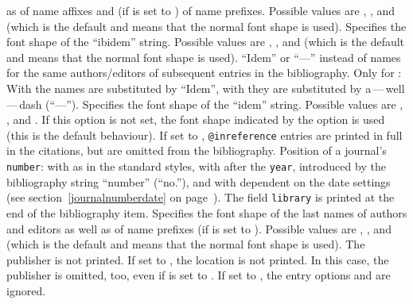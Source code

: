 \documentclass[english]{scrartcl}
\begin{document}
	  as of name affixes and (if  is set to ) of 
	  name prefixes. Possible values are , , 
	   and  (which is the default and means that the 
	  normal font shape is used).
	  Specifies the font shape of the \enquote{ibidem} string.
	  Possible values are , ,  and 
	   (which is the default and means that the normal font shape 
	  is used).
	  \enquote{Idem} or \enquote{---} instead of names for the same 
	  authors\slash editors of subsequent entries in the bibliography.
	  Only for : With  the names are substituted 
	  by \enquote{Idem}, with  they are substituted by
	  a\,---\,well\,---\,dash (\enquote{---}).
	  Specifies the font shape of the \enquote{idem} string.
	  Possible values are , ,  and 
	  . If this option is not set, the font shape indicated by the 
	  option  is used (this is the default behaviour).
	  If set to , \texttt{@inreference} entries are printed in full
	  in the citations, but are omitted from the bibliography.
	  Position of a journal's \texttt{number}: with  as in the 
	  standard styles, with  after the \texttt{year}, introduced 
	  by the bibliography string \enquote{number} (\enquote{no.}), and with 
	   dependent on the date settings (see 
	  section~\ref{journalnumberdate} on page~\pageref{journalnumberdate}).
	  The field \texttt{library} is printed at the end of the bibliography item.
	  Specifies the font shape of the last names of authors and editors as well 
	  as of name prefixes (if  is set to ).
	  Possible values are , ,  and 
	   (which is the default and means that the normal font shape 
	  is used).
	  The publisher is not printed.
	  If set to , the location is not printed. In this case, the 
	  publisher is omitted, too, even if  is set to 
	  .
	  If set to , the entry options  and
     are ignored.
\end{document}
